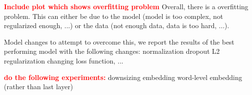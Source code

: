 \textcolor{red}{\textbf{Include plot which shows overfitting problem}}
Overall, there is a overfitting problem. This can either be due to the model (model is too complex, not regularized enough, ...) or the data (not enough data, data is too hard, ...).

Model changes to attempt to overcome this, we report the results of the best performing model with the following changes: 
normalization
dropout
L2 regularization
changing loss function, ...

\textcolor{red}{\textbf{do the following experiments:}}
downsizing embedding
word-level embedding (rather than last layer)